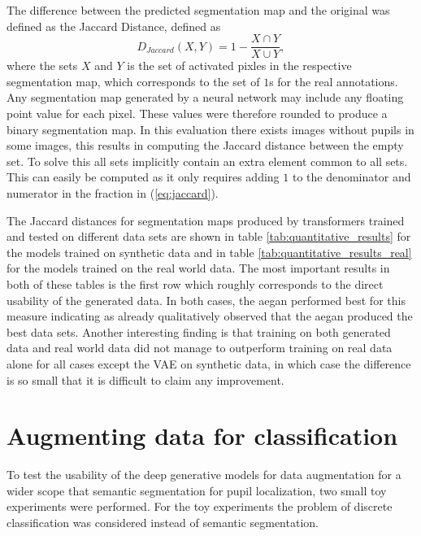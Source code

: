 The difference between the predicted segmentation map and the original was defined as the Jaccard Distance, defined as
\begin{equation}
    D_{Jaccard}(X, Y) = 1 - \frac{X \cap Y}{X \cup Y},
    \label{eq:jaccard}
\end{equation}
where the sets $X$ and $Y$ is the set of activated pixles in the respective segmentation map, which corresponds to the set of $1$s for the real annotations. Any segmentation map generated by a neural network may include any floating point value for each pixel. These values were therefore rounded to produce a binary segmentation map. In this evaluation there exists images without pupils in some images, this results in computing the Jaccard distance between the empty set. To solve this all sets implicitly contain an extra element common to all sets. This can easily be computed as it only requires adding $1$ to the denominator and numerator in the fraction in (\ref{eq:jaccard}).

The Jaccard distances for segmentation maps produced by transformers trained and tested on different data sets are shown in table \ref{tab:quantitative_results} for the models trained on synthetic data and in table \ref{tab:quantitative_results_real} for the models trained on the real world data. The most important results in both of these tables is the first row which roughly corresponds to the direct usability of the generated data. In both cases, the \acrshort{aegan} performed best for this measure indicating as already qualitatively observed that the \acrshort{aegan} produced the best data sets. Another interesting finding is that training on both generated data and real world data did not manage to outperform training on real data alone for all cases except the VAE on synthetic data, in which case the difference is so small that it is difficult to claim any improvement.


\section{Augmenting data for classification}
To test the usability of the deep generative models for data augmentation for a wider scope that semantic segmentation for pupil localization, two small toy experiments were performed. For the toy experiments the problem of discrete classification was considered instead of semantic segmentation.

